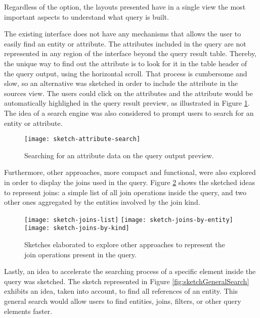 Regardless of the option, the layouts presented have in a single view the most important aspects to understand what query is built.

The existing interface does not have any mechanisms that allows the user to easily find an entity or attribute. The attributes included in the query are not represented in any region of the interface beyond the query result table. Thereby, the unique way to find out the attribute is to look for it in the table header of the query output, using the horizontal scroll. That process is cumbersome and slow, so an alternative was sketched in order to include the attribute in the sources view. The users could click on the attributes and the attribute would be automatically highlighed in the query result preview, as illustrated in Figure \ref{fig:sketchAttributeSearch}. The idea of a search engine was also considered to prompt users to search for an entity or attribute.

\begin{figure}[htbp]
	\centering
	\texttt{[image: sketch-attribute-search]}
	\caption{Searching for an attribute data on the query output preview.}
	\label{fig:sketchAttributeSearch}
\end{figure}

Furthermore, other approaches, more compact and functional, were also explored in order to display the joins used in the query. Figure \ref{fig:sketchJoins} shows the sketched ideas to represent joins: a simple list of all join operations inside the query, and two other ones aggregated by the entities involved by the join kind.

\begin{figure}[tb]
  \centering
    {\texttt{[image: sketch-joins-list]}}%
  {\texttt{[image: sketch-joins-by-entity]}}%
  {\texttt{[image: sketch-joins-by-kind]}}%
\caption{Sketches elaborated to explore other approaches to represent the join operations present in the query.}
  \label{fig:sketchJoins}
\end{figure}

Lastly, an idea to accelerate the searching process of a specific element inside the query was sketched. The sketch represented in Figure \ref{fig:sketchGeneralSearch} exhibits an idea, taken into account, to find all references of an entity. This general search would allow users to find entities, joins, filters, or other query elements faster.

